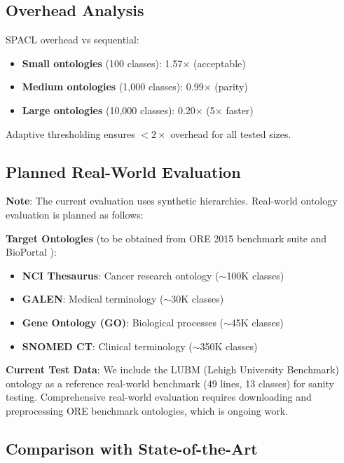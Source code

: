 \documentclass[preprint,12pt]{elsarticle}
\begin{document}
\subsection{Overhead Analysis}
\label{sec:overhead}

SPACL overhead vs sequential:
\begin{itemize}
    \item \textbf{Small ontologies} (100 classes): 1.57$\times$ (acceptable)
    \item \textbf{Medium ontologies} (1,000 classes): 0.99$\times$ (parity)
    \item \textbf{Large ontologies} (10,000 classes): 0.20$\times$ (5$\times$ faster)
\end{itemize}

Adaptive thresholding ensures $<2\times$ overhead for all tested sizes.

\subsection{Planned Real-World Evaluation}
\label{sec:realworld}

\textbf{Note}: The current evaluation uses synthetic hierarchies. Real-world ontology evaluation is planned as follows:

\textbf{Target Ontologies} (to be obtained from ORE 2015 benchmark suite \cite{parsia2015ore} and BioPortal \cite{bioportal}):
\begin{itemize}
    \item \textbf{NCI Thesaurus}: Cancer research ontology ($\sim$100K classes)
    \item \textbf{GALEN}: Medical terminology ($\sim$30K classes)
    \item \textbf{Gene Ontology (GO)}: Biological processes ($\sim$45K classes)
    \item \textbf{SNOMED CT}: Clinical terminology ($\sim$350K classes)
\end{itemize}

\textbf{Current Test Data}: We include the LUBM (Lehigh University Benchmark) ontology \cite{lubm} as a reference real-world benchmark (49 lines, 13 classes) for sanity testing. Comprehensive real-world evaluation requires downloading and preprocessing ORE benchmark ontologies, which is ongoing work.

\subsection{Comparison with State-of-the-Art}
\label{sec:comparison}
\end{document}
